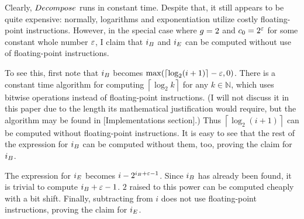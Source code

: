 Clearly, $Decompose$ runs in constant time. Despite that, it still appears to be quite expensive: normally, logarithms and exponentiation utilize costly floating-point instructions. However, in the special case where $g = 2$ and $c_0 = 2^\varepsilon$ for some constant whole number $\varepsilon$, I claim that $i_B$ and $i_E$ can be computed without use of floating-point instructions.

To see this, first note that $i_B$ becomes $\max(\left\lceil \log_2 (i + 1) \right\rceil - \varepsilon, 0)$. There is a constant time algorithm for computing $\left\lceil \log_2 k \right\rceil$ for any $k \in \mathbb{N}$, which uses bitwise operations instead of floating-point instructions. (I will not discuss it in this paper due to the length its mathematical justification would require, but the algorithm may be found in [Implementations section].) Thus $\left\lceil \log_2 (i + 1) \right\rceil$ can be computed without floating-point instructions. It is easy to see that the rest of the expression for $i_B$ can be computed without them, too, proving the claim for $i_B$.

The expression for $i_E$ becomes $i - 2^{i_B + \varepsilon - 1}$. Since $i_B$ has already been found, it is trivial to compute $i_B + \varepsilon - 1$. $2$ raised to this power can be computed cheaply with a bit shift. Finally, subtracting from $i$ does not use floating-point instructions, proving the claim for $i_E$.